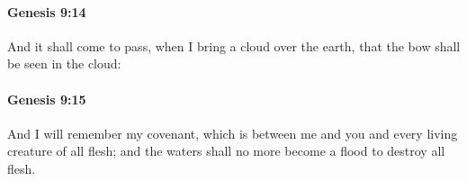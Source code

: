 		\paragraph{Genesis 9:14} %
			\label{GENESIS-9-14}

			And it shall come to pass, when I bring a cloud over the earth, that the bow shall be seen in the cloud:


		\paragraph{Genesis 9:15} %
			\label{GENESIS-9-15}

			And I will remember my covenant, which is between me and you and every living creature of all flesh; and the waters shall no more become a flood to destroy all flesh.


